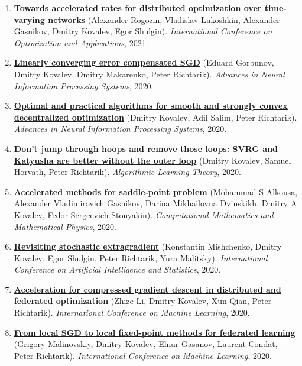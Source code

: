 \begin{enumerate}
\item
\textbf{\href{https://link.springer.com/chapter/10.1007/978-3-030-91059-4_19}{Towards accelerated rates for distributed optimization over time-varying networks}} (Alexander Rogozin, Vladislav Lukoshkin, Alexander Gasnikov, Dmitry Kovalev, Egor Shulgin). \textit{International Conference on Optimization and Applications}, 2021.
\item
\textbf{\href{https://proceedings.neurips.cc/paper_files/paper/2020/hash/ef9280fbc5317f17d480e4d4f61b3751-Abstract.html}{Linearly converging error compensated SGD}} (Eduard Gorbunov, Dmitry Kovalev, Dmitry Makarenko, Peter Richtarik). \textit{Advances in Neural Information Processing Systems}, 2020.
\item
\textbf{\href{https://proceedings.neurips.cc/paper_files/paper/2020/hash/d530d454337fb09964237fecb4bea6ce-Abstract.html}{Optimal and practical algorithms for smooth and strongly convex decentralized optimization}} (Dmitry Kovalev, Adil Salim, Peter Richtarik). \textit{Advances in Neural Information Processing Systems}, 2020.
\item
\textbf{\href{https://proceedings.mlr.press/v117/kovalev20a.html}{Don’t jump through hoops and remove those loops: SVRG and Katyusha are better without the outer loop}} (Dmitry Kovalev, Samuel Horvath, Peter Richtarik). \textit{Algorithmic Learning Theory}, 2020.
\item
\textbf{\href{https://link.springer.com/article/10.1134/S0965542520110020}{Accelerated methods for saddle-point problem}} (Mohammad S Alkousa, Alexander Vladimirovich Gasnikov, Darina Mikhailovna Dvinskikh, Dmitry A Kovalev, Fedor Sergeevich Stonyakin). \textit{Computational Mathematics and Mathematical Physics}, 2020.
\item
\textbf{\href{http://proceedings.mlr.press/v108/mishchenko20a}{Revisiting stochastic extragradient}} (Konstantin Mishchenko, Dmitry Kovalev, Egor Shulgin, Peter Richtarik, Yura Malitsky). \textit{International Conference on Artificial Intelligence and Statistics}, 2020.
\item
\textbf{\href{http://proceedings.mlr.press/v119/li20g.html}{Acceleration for compressed gradient descent in distributed and federated optimization}} (Zhize Li, Dmitry Kovalev, Xun Qian, Peter Richtarik). \textit{International Conference on Machine Learning}, 2020.
\item
\textbf{\href{http://proceedings.mlr.press/v119/malinovskiy20a.html}{From local SGD to local fixed-point methods for federated learning}} (Grigory Malinovskiy, Dmitry Kovalev, Elnur Gasanov, Laurent Condat, Peter Richtarik). \textit{International Conference on Machine Learning}, 2020.

\end{enumerate}
